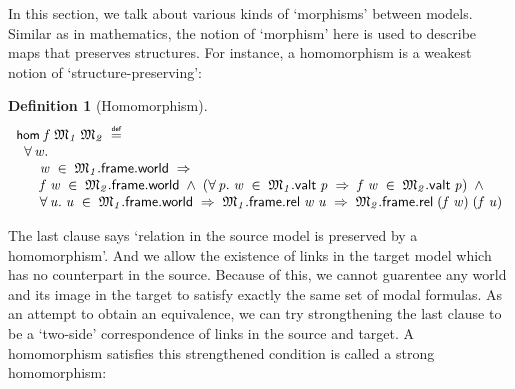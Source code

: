 \documentclass[letterpaper]{article}
\newtheorem{defn}{Definition}
\renewcommand{\HOLConst}[1]{{\textsf{\upshape\small #1}}}
\newenvironment{holmath}{\begin{displaymath}\begin{array}{l}}{\end{array}\end{displaymath}\ignorespacesafterend}
\begin{document}
In this section, we talk about various kinds of `morphisms' between models. Similar as in mathematics, the notion of `morphism' here is used to describe maps that preserves structures. For instance, a homomorphism is a weakest notion of `structure-preserving':
\begin{defn}[Homomorphism]
\begin{holmath}
  \HOLConst{hom}\;\HOLFreeVar{f}\;\HOLFreeVar{\ensuremath{\mathfrak{M}\sb{1}}}\;\HOLFreeVar{\ensuremath{\mathfrak{M}\sb{2}}}\;\HOLSymConst{\HOLTokenDefEquality{}}\\
\;\;\HOLSymConst{\HOLTokenForall{}}\HOLBoundVar{w}.\\
\;\;\;\;\;\;\HOLBoundVar{w}\;\HOLSymConst{\HOLTokenIn{}}\;\HOLFreeVar{\ensuremath{\mathfrak{M}\sb{1}}}.\HOLFieldName{frame}.\HOLFieldName{world}\;\HOLSymConst{\HOLTokenImp{}}\\
\;\;\;\;\;\;\HOLFreeVar{f}\;\HOLBoundVar{w}\;\HOLSymConst{\HOLTokenIn{}}\;\HOLFreeVar{\ensuremath{\mathfrak{M}\sb{2}}}.\HOLFieldName{frame}.\HOLFieldName{world}\;\HOLSymConst{\HOLTokenConj{}}\;(\HOLSymConst{\HOLTokenForall{}}\HOLBoundVar{p}.\;\HOLBoundVar{w}\;\HOLSymConst{\HOLTokenIn{}}\;\HOLFreeVar{\ensuremath{\mathfrak{M}\sb{1}}}.\HOLFieldName{valt}\;\HOLBoundVar{p}\;\HOLSymConst{\HOLTokenImp{}}\;\HOLFreeVar{f}\;\HOLBoundVar{w}\;\HOLSymConst{\HOLTokenIn{}}\;\HOLFreeVar{\ensuremath{\mathfrak{M}\sb{2}}}.\HOLFieldName{valt}\;\HOLBoundVar{p})\;\HOLSymConst{\HOLTokenConj{}}\\
\;\;\;\;\;\;\HOLSymConst{\HOLTokenForall{}}\HOLBoundVar{u}.\;\HOLBoundVar{u}\;\HOLSymConst{\HOLTokenIn{}}\;\HOLFreeVar{\ensuremath{\mathfrak{M}\sb{1}}}.\HOLFieldName{frame}.\HOLFieldName{world}\;\HOLSymConst{\HOLTokenImp{}}\;\HOLFreeVar{\ensuremath{\mathfrak{M}\sb{1}}}.\HOLFieldName{frame}.\HOLFieldName{rel}\;\HOLBoundVar{w}\;\HOLBoundVar{u}\;\HOLSymConst{\HOLTokenImp{}}\;\HOLFreeVar{\ensuremath{\mathfrak{M}\sb{2}}}.\HOLFieldName{frame}.\HOLFieldName{rel}\;(\HOLFreeVar{f}\;\HOLBoundVar{w})\;(\HOLFreeVar{f}\;\HOLBoundVar{u})
\end{holmath}
\end{defn}
The last clause says `relation in the source model is preserved by a homomorphism'. And we allow the existence of links in the target model which has no counterpart in the source. Because of this, we cannot guarentee any world and its image in the target to satisfy exactly the same set of modal formulas. As an attempt to obtain an equivalence, we can try strongthening the last clause to be a `two-side' correspondence of links in the source and target. A homomorphism satisfies this strengthened condition is called a strong homomorphism:
\end{document}
